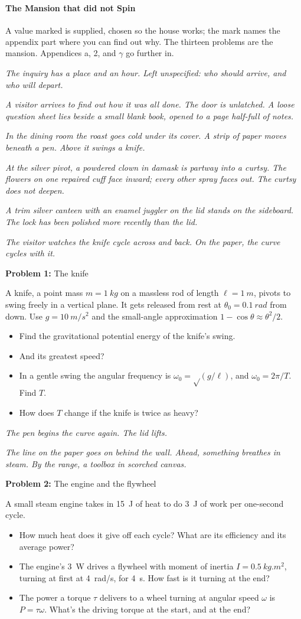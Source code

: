 \documentclass[11pt]{article}
\newcommand{\room}[1]{\par\bigskip{\large\bfseries #1}\par\nopagebreak\smallskip}
\newcommand{\scene}[1]{\par{\itshape #1}\par}
\newcommand{\problem}[2]{\par\medskip\textbf{Problem #1:} #2\par\nopagebreak}
\newenvironment{parts}{\begin{itemize}[leftmargin=3.4em,labelwidth=2.8em,labelsep=0.6em,align=left,itemsep=2pt,topsep=3pt]}{\end{itemize}}
\newcommand{\pt}[1]{\item[\textbf{#1}]}
\newcommand{\rt}{\text{√}}  %
\begin{document}
\thispagestyle{plain}
\begin{center}
{\LARGE\bfseries The Mansion that did not Spin}
\end{center}

A value marked \textsuperscript{\dag} is supplied, chosen so the house works; the mark names the appendix part where you can find out why. The thirteen problems are the mansion. Appendices a, 2, and $\gamma$ go further in.

\room{The way in}
\scene{The inquiry has a place and an hour. Left unspecified: who should arrive, and who will depart.}
\scene{A visitor arrives to find out how it was all done. The door is unlatched. A loose question sheet lies beside a small blank book, opened to a page half-full of notes.}
\scene{In the dining room the roast goes cold under its cover. A strip of paper moves beneath a pen. Above it swings a knife.}
\scene{At the silver pivot, a powdered clown in damask is partway into a curtsy. The flowers on one repaired cuff face inward; every other spray faces out. The curtsy does not deepen.}
\scene{A trim silver canteen with an enamel juggler on the lid stands on the sideboard. The lock has been polished more recently than the lid.}
\scene{The visitor watches the knife cycle across and back. On the paper, the curve cycles with it.}

\room{Dining room}
\problem{1}{The knife}
A knife, a point mass $m = \SI{1}{kg}$ on a massless rod of length $\ell = \SI{1}{m}$, pivots to swing freely in a vertical plane. It gets released from rest at $\theta_0 = \SI{0.1}{rad}$ from down. Use $g = \SI{10}{m/s^2}$ and the small-angle approximation $1 - \cos\theta \approx \theta^2/2$.
\begin{parts}
\pt{1-a} Find the gravitational potential energy of the knife's swing.
\pt{1-b} And its greatest speed?
\pt{1-c} In a gentle swing the angular frequency is $\omega_0 = \rt(g/\ell)$, and $\omega_0 = 2\pi/T$. Find $T$.
\pt{1-d} How does $T$ change if the knife is twice as heavy?
\end{parts}
\scene{The pen begins the curve again. The lid lifts.}

\room{Kitchen}
\scene{The line on the paper goes on behind the wall. Ahead, something breathes in steam. By the range, a toolbox in scorched canvas.}
\problem{2}{The engine and the flywheel}
A small steam engine takes in \SI{15}{J} of heat to do \SI{3}{J} of work per one-second cycle.
\begin{parts}
\pt{2-a} How much heat does it give off each cycle? What are its efficiency and its average power?
\pt{2-b} The engine's \SI{3}{W} drives a flywheel with moment of inertia $I = \SI{0.5}{kg.m^2}$, turning at first at \SI{4}{rad/s}, for \SI{4}{s}. How fast is it turning at the end?
\pt{2-c} The power a torque $\tau$ delivers to a wheel turning at angular speed $\omega$ is $P = \tau\omega$. What's the driving torque at the start, and at the end?
\end{parts}
\end{document}
